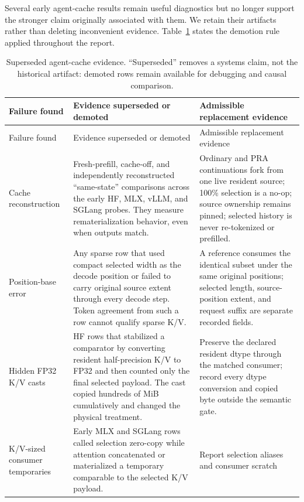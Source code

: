 \documentclass[11pt]{article}
\begin{document}
Several early agent-cache results remain useful diagnostics but no longer
support the stronger claim originally associated with them.  We retain their
artifacts rather than deleting inconvenient evidence.  Table~\ref{tab:superseded-agent-evidence}
states the demotion rule applied throughout the report.

\begingroup
\small
\begin{longtable}{@{}p{}p{}p{}@{}}
\caption{Superseded agent-cache evidence.  ``Superseded'' removes a systems
claim, not the historical artifact: demoted rows remain available for debugging
and causal comparison.}\label{tab:superseded-agent-evidence}\\
\toprule
Failure found & Evidence superseded or demoted & Admissible replacement evidence \\
\midrule
\endfirsthead
\toprule
Failure found & Evidence superseded or demoted & Admissible replacement evidence \\
\midrule
\endhead
Cache reconstruction & Fresh-prefill, cache-off, and independently reconstructed
``same-state'' comparisons across the early HF, MLX, vLLM, and SGLang probes.
They measure rematerialization behavior, even when outputs match. & Ordinary and
PRA continuations fork from one live resident source; 100\% selection is a
no-op; source ownership remains pinned; selected history is never re-tokenized
or prefilled. \\
\addlinespace
Position-base error & Any sparse row that used compact selected width as the
decode position or failed to carry original source extent through every decode
step.  Token agreement from such a row cannot qualify sparse K/V. & A reference
consumes the identical subset under the same original positions; selected
length, source-position extent, and request suffix are separate recorded
fields. \\
\addlinespace
Hidden FP32 K/V casts & HF rows that stabilized a comparator by converting
resident half-precision K/V to FP32 and then counted only the final selected
payload.  The cast copied hundreds of MiB cumulatively and changed the physical
treatment. & Preserve the declared resident dtype through the matched consumer;
record every dtype conversion and copied byte outside the semantic gate. \\
\addlinespace
K/V-sized consumer temporaries & Early MLX and SGLang rows called selection
zero-copy while attention concatenated or materialized a temporary comparable
to the selected K/V payload. & Report selection aliases and consumer scratch

\end{longtable}
\end{document}
